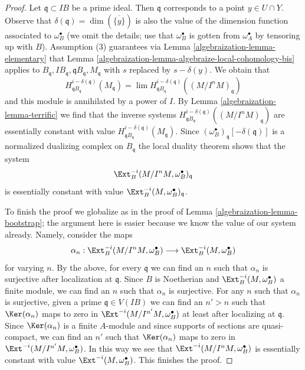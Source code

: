\begin{proof}
\medskip\noindent
Let $\mathfrak q \subset IB$ be a prime ideal. Then $\mathfrak q$ corresponds
to a point $y \in U \cap Y$. Observe that
$\delta(\mathfrak q) = \dim(\overline{\{y\}})$
is also the value of the dimension function associated to $\omega_B^\bullet$
(we omit the details; use that $\omega_B^\bullet$ is gotten from
$\omega_A^\bullet$ by tensoring up with $B$). Assumption
(3) guarantees via Lemma \ref{algebraization-lemma-elementary}
that Lemma \ref{algebraization-lemma-algebraize-local-cohomology-bis}
applies to
$B_\mathfrak q, IB_\mathfrak q, \mathfrak qB_\mathfrak q, M_\mathfrak q$
with $s$ replaced by $s - \delta(y)$. We obtain that
$$
H^{i - \delta(\mathfrak q)}_{\mathfrak qB_\mathfrak q}(M_\mathfrak q) =
\lim H^{i - \delta(\mathfrak q)}_{\mathfrak qB_\mathfrak q}(
(M/I^nM)_\mathfrak q)
$$
and this module is annihilated by a power of $I$.
By Lemma \ref{algebraization-lemma-terrific} we find that the inverse systems
$H^{i - \delta(\mathfrak q)}_{\mathfrak qB_\mathfrak q}((M/I^nM)_\mathfrak q)$
are essentially constant with value
$H^{i - \delta(\mathfrak q)}_{\mathfrak qB_\mathfrak q}(M_\mathfrak q)$.
Since $(\omega_B^\bullet)_\mathfrak q[-\delta(\mathfrak q)]$ is a normalized
dualizing complex on $B_\mathfrak q$ the local duality theorem
shows that the system
$$
\Ext^{-i}_B(M/I^n M, \omega_B^\bullet)_\mathfrak q
$$
is essentially constant with value
$\Ext^{-i}_B(M, \omega_B^\bullet)_\mathfrak q$.

\medskip\noindent
To finish the proof we globalize as in the proof of
Lemma \ref{algebraization-lemma-bootstrap}; the argument here is easier
because we know the value of our system already. Namely, consider the maps
$$
\alpha_n :
\Ext^{-i}_B(M/I^n M, \omega_B^\bullet)
\longrightarrow
\Ext^{-i}_B(M, \omega_B^\bullet)
$$
for varying $n$. By the above, for every $\mathfrak q$ we can find an
$n$ such that $\alpha_n$ is surjective after localization at $\mathfrak q$.
Since $B$ is Noetherian and $\Ext^{-i}_B(M, \omega_B^\bullet)$
a finite module, we can find an $n$ such that $\alpha_n$ is surjective.
For any $n$ such that $\alpha_n$ is surjective, given a prime
$\mathfrak q \in V(IB)$ we can find an $n' > n$ such that
$\Ker(\alpha_n)$ maps to zero in $\Ext^{-i}(M/I^{n'}M, \omega_B^\bullet)$
at least after localizing at $\mathfrak q$.
Since $\Ker(\alpha_n)$ is a finite $A$-module and since supports of
sections are quasi-compact, we can find an $n'$ such that
$\Ker(\alpha_n)$ maps to zero in $\Ext^{-i}(M/I^{n'}M, \omega_B^\bullet)$.
In this way we see that $\Ext^{-i}(M/I^n M, \omega_B^\bullet)$
is essentially constant with value $\Ext^{-i}(M, \omega_B^\bullet)$.
This finishes the proof.
\end{proof}

